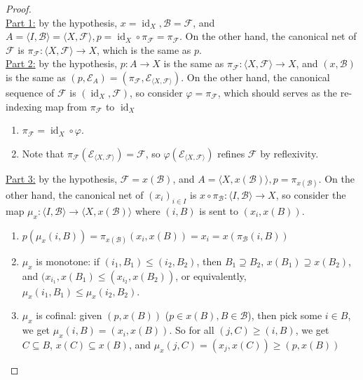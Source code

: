 \documentclass{treatise}
\begin{document}
\begin{proof} \ \\
\underline{Part 1:} by the hypothesis, $x = \operatorname{id}_X, \mathcal{B} = \mathcal{F}$, and $A = \langle I, \mathcal{B} \rangle = \langle X, \mathcal{F} \rangle, p = \operatorname{id}_X \circ \pi_\mathcal{F} = \pi_\mathcal{F}$. On the other hand, the canonical net of $\mathcal{F}$ is $\pi_\mathcal{F}: \langle X, \mathcal{F} \rangle \to X$, which is the same as $p$.
\\
\underline{Part 2:} by the hypothesis, $p: A \to X$ is the same as $\pi_\mathcal{F} : \langle X, \mathcal{F} \rangle \to X$, and $(x, \mathcal{B})$ is the same as $(p, \mathcal{E}_A) = (\pi_\mathcal{F}, \mathcal{E}_{\langle X, \mathcal{F} \rangle})$. On the other hand, the canonical sequence of $\mathcal{F}$ is $(\operatorname{id}_X, \mathcal{F})$, so consider $\varphi = \pi_\mathcal{F}$, which should serves as the re-indexing map from $\pi_\mathcal{F}$ to $\operatorname{id}_X$
\begin{enumerate}
    \item $\pi_\mathcal{F} = \operatorname{id}_X \circ \varphi$.
    \item Note that $\pi_\mathcal{F}(\mathcal{E}_{\langle X, \mathcal{F} \rangle}) = \mathcal{F}$, so $\varphi(\mathcal{E}_{\langle X, \mathcal{F} \rangle})$ refines $\mathcal{F}$ by reflexivity.
\end{enumerate}
\underline{Part 3:} by the hypothesis, $\mathcal{F} = x(\mathcal{B})$, and $A = \langle X, x(\mathcal{B}) \rangle, p = \pi_{x(\mathcal{B})}$. On the other hand, the canonical net of $(x_i)_{i \in I}$ is $x \circ \pi_\mathcal{B}: \langle I, \mathcal{B} \rangle \to X$, so consider the map $\mu_x : \langle I, \mathcal{B} \rangle \to \langle X, x(\mathcal{B}) \rangle$ where $(i, B)$ is sent to $(x_i, x(B))$.
\begin{enumerate}
    \item $p(\mu_x(i, B)) = \pi_{x(\mathcal{B})} (x_i, x(B)) = x_i = x(\pi_\mathcal{B}(i, B))$
    \item $\mu_x$ is monotone: if $(i_1, B_1) \leq (i_2, B_2)$, then $B_1 \supseteq B_2$, $x(B_1) \supseteq x(B_2)$, and $(x_{i_1}, x(B_1) \leq (x_{i_2}, x(B_2))$, or equivalently, $\mu_x(i_1, B_1) \leq \mu_x (i_2, B_2)$.
    \item $\mu_x$ is cofinal: given $(p, x(B))$ ($p \in x(B), B \in \mathcal{B}$), then pick some $i \in B$, we get $\mu_x(i, B) = (x_i, x(B))$. So for all $(j, C) \geq (i, B)$, we get $C \subseteq B$, $x(C) \subseteq x(B)$, and $\mu_x(j, C) = (x_j, x(C)) \geq (p, x(B))$

\end{enumerate}
\end{proof}
\end{document}
